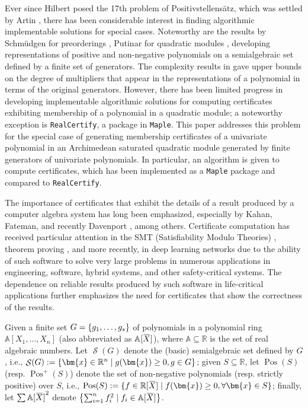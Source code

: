 \documentclass[preprint,12pt,authoryear]{elsarticle}
\newcommand{\overbar}[1]{\mkern 1.5mu\overline{\mkern-1.5mu #1 \mkern-1.5mu}\mkern 1.5mu}
\newcommand{\rXY}{\mathbb{R}[\overbar{X}]}
\newcommand{\aXX}{\mathbb{A}[X_1, \dots, X_n]}
\newcommand{\aXY}{\mathbb{A}[\overbar{X}]}
\DeclarePairedDelimiter{\set}{\lbrace}{\rbrace}
\DeclareMathOperator{\semialgebraic}{\mathcal{S}}
\DeclareMathOperator{\Pos}{Pos}
\newcommand{\maple}{\texttt{Maple}\xspace}
\newcommand{\rc}{\texttt{RealCertify}\xspace}
\begin{document}
Ever since Hilbert posed the 17th problem of Positivstellens\"atz, which was
settled by Artin \cite{Artin}, there has been considerable interest in finding
algorithmic implementable solutions for special cases. Noteworthy are the
results by Schm\"udgen for preorderings \cite{Schmdgen1991TheKmomentPF}, Putinar
for quadratic modules \cite{10.2307/24897130}, developing representations of
positive and non-negative polynomials on a semialgebraic set defined by a
finite set of generators. The complexity results in
\cite{10.1016/j.jco.2006.07.002,SCHWEIGHOFER2002307} gave upper bounds on the
degree of multipliers that appear in the representations of a polynomial in
terms of the original generators. However, there has been limited progress in
developing implementable algorithmic solutions for computing certificates
exhibiting membership of a polynomial in a quadratic module; a noteworthy
exception is \rc, a package in \maple. This paper addresses this problem for the
special case of generating membership certificates of a univariate polynomial in
an Archimedean saturated quadratic module generated by finite generators of
univariate polynomials. In particular, an algorithm is given to compute
certificates, which has been implemented as a \maple package and compared to
\rc.

The importance of certificates that exhibit the details of a result produced by
a computer algebra system has long been emphasized, especially by Kahan,
Fateman, \cite{Fateman2000ImprovingEI} and recently Davenport
\cite{10.1007/978-3-031-42753-4_17}, among others. Certificate computation has
received particular attention in the SMT (Satisfiability Modulo Theories)
\cite{BdMF15, 10.1007/978-3-031-10769-6_3}, theorem proving
\cite{gregoire2011proof}, and more recently, in deep learning networks
\cite{katz2017reluplex, singh2018fast, singh2019abstract} due to the ability of
such software to solve very large problems in numerous applications in
engineering, software, hybrid systems, and other safety-critical systems. The
dependence on reliable results produced by such software in life-critical
applications further emphasizes the need for certificates that show the
correctness of the results.

Given a finite set $G =\set{g_1, \dots, g_s}$ of polynomials in a polynomial
ring $\aXX$ (also abbreviated as $\aXY$), where
$\mathbb{A} \subseteq \mathbb{R}$ is the set of real algebraic numbers. Let
$\semialgebraic(G)$ denote the (basic) semialgebraic set defined by $G$, i.e.,
$\semialgebraic(G) := \set*{\bm{x} \in \mathbb{R}^n \mid g(\bm{x}) \geq 0, g \in
  G}$; given $S \subseteq \mathbb{R}$, let $\Pos(S)$ (resp. $\Pos^{+}(S)$)
denote the set of non-negative polynomials (resp. strictly positive) over $S$,
i.e., $\Pos(S) := \set{f \in \rXY \mid f(\bm{x}) \geq 0, \forall \bm{x} \in S}$;
finally, let $\sum{\aXY}^2$ denote
$\set*{\sum_{i=1}^{n}{f_i^{2}} \mid f_i \in \aXY}$.
\end{document}
